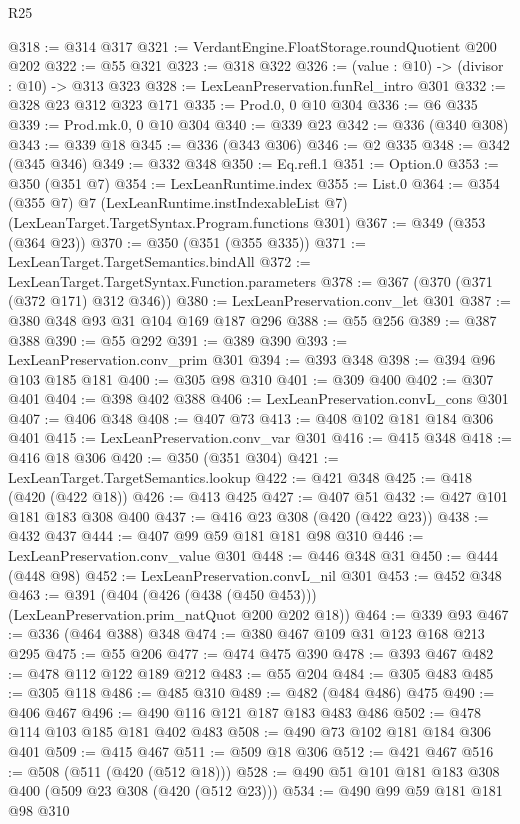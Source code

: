 \begin{lexlean}{R25}
\begin{coremodule}
@318 := @314 @317
@321 := VerdantEngine.FloatStorage.roundQuotient @200 @202
@322 := @55 @321
@323 := @318 @322
@326 := (value : @10) -> (divisor : @10) -> @313 @323
@328 := LexLeanPreservation.funRel_intro @301
@332 := @328 @23 @312 @323 @171
@335 := Prod.{0, 0} @10 @304
@336 := @6 @335
@339 := Prod.mk.{0, 0} @10 @304
@340 := @339 @23
@342 := @336 (@340 @308)
@343 := @339 @18
@345 := @336 (@343 @306)
@346 := @2 @335
@348 := @342 (@345 @346)
@349 := @332 @348
@350 := Eq.refl.{1}
@351 := Option.{0}
@353 := @350 (@351 @7)
@354 := LexLeanRuntime.index
@355 := List.{0}
@364 := @354
    (@355 @7)
    @7
    (LexLeanRuntime.instIndexableList @7)
    (LexLeanTarget.TargetSyntax.Program.functions @301)
@367 := @349 (@353 (@364 @23))
@370 := @350 (@351 (@355 @335))
@371 := LexLeanTarget.TargetSemantics.bindAll
@372 := LexLeanTarget.TargetSyntax.Function.parameters
@378 := @367 (@370 (@371 (@372 @171) @312 @346))
@380 := LexLeanPreservation.conv_let @301
@387 := @380 @348 @93 @31 @104 @169 @187 @296
@388 := @55 @256
@389 := @387 @388
@390 := @55 @292
@391 := @389 @390
@393 := LexLeanPreservation.conv_prim @301
@394 := @393 @348
@398 := @394 @96 @103 @185 @181
@400 := @305 @98 @310
@401 := @309 @400
@402 := @307 @401
@404 := @398 @402 @388
@406 := LexLeanPreservation.convL_cons @301
@407 := @406 @348
@408 := @407 @73
@413 := @408 @102 @181 @184 @306 @401
@415 := LexLeanPreservation.conv_var @301
@416 := @415 @348
@418 := @416 @18 @306
@420 := @350 (@351 @304)
@421 := LexLeanTarget.TargetSemantics.lookup
@422 := @421 @348
@425 := @418 (@420 (@422 @18))
@426 := @413 @425
@427 := @407 @51
@432 := @427 @101 @181 @183 @308 @400
@437 := @416 @23 @308 (@420 (@422 @23))
@438 := @432 @437
@444 := @407 @99 @59 @181 @181 @98 @310
@446 := LexLeanPreservation.conv_value @301
@448 := @446 @348 @31
@450 := @444 (@448 @98)
@452 := LexLeanPreservation.convL_nil @301
@453 := @452 @348
@463 := @391 (@404 (@426 (@438 (@450 @453))) (LexLeanPreservation.prim_natQuot @200 @202 @18))
@464 := @339 @93
@467 := @336 (@464 @388) @348
@474 := @380 @467 @109 @31 @123 @168 @213 @295
@475 := @55 @206
@477 := @474 @475 @390
@478 := @393 @467
@482 := @478 @112 @122 @189 @212
@483 := @55 @204
@484 := @305 @483
@485 := @305 @118
@486 := @485 @310
@489 := @482 (@484 @486) @475
@490 := @406 @467
@496 := @490 @116 @121 @187 @183 @483 @486
@502 := @478 @114 @103 @185 @181 @402 @483
@508 := @490 @73 @102 @181 @184 @306 @401
@509 := @415 @467
@511 := @509 @18 @306
@512 := @421 @467
@516 := @508 (@511 (@420 (@512 @18)))
@528 := @490 @51 @101 @181 @183 @308 @400 (@509 @23 @308 (@420 (@512 @23)))
@534 := @490 @99 @59 @181 @181 @98 @310

\end{coremodule}
\end{lexlean}
